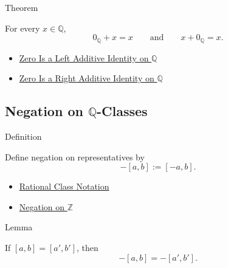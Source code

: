 \begin{theorembox}{Theorem}
\begin{theorem}
\label{thm:zero-additive-identity-on-q}
For every $x\in\mathbb{Q}$,
\[
0_{\mathbb{Q}}+x=x
\qquad\text{and}\qquad
x+0_{\mathbb{Q}}=x.
\]
\end{theorem}
\end{theorembox}

\begin{dependencies}
\begin{itemize}
  \item \hyperref[thm:zero-left-additive-identity-on-q]{Zero Is a Left Additive Identity on $\mathbb{Q}$}
  \item \hyperref[cor:zero-right-additive-identity-on-q]{Zero Is a Right Additive Identity on $\mathbb{Q}$}
\end{itemize}
\end{dependencies}

\subsection*{\texorpdfstring{Negation on $\mathbb{Q}$-Classes}{Negation on Q-Classes}}

\begin{definitionbox}{Definition}
\begin{definition}
\label{def:negation-on-q-classes}
Define negation on representatives by
\[
-[a,b]:=[-a,b].
\]
\end{definition}
\end{definitionbox}

\begin{dependencies}
\begin{itemize}
  \item \hyperref[def:rational-class-notation]{Rational Class Notation}
  \item \hyperref[def:negation-on-z-classes]{Negation on $\mathbb{Z}$}
\end{itemize}
\end{dependencies}

\begin{lemmabox}{Lemma}
\begin{lemma}
\label{lem:negation-on-q-respects-equivalence}
If $[a,b]=[a',b']$, then
\[
-[a,b]=-[a',b'].
\]
\end{lemma}
\end{lemmabox}

